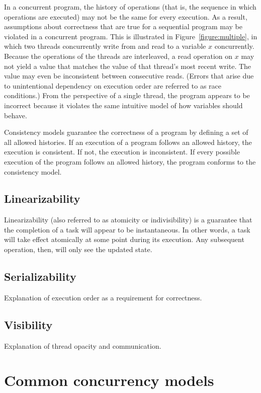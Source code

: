 \documentclass{sig-alternate}
\begin{document}
In a concurrent program, the history of operations (that is, the sequence in which operations are executed) may not be the same for every execution. As a result, assumptions about correctness that are true for a sequential program may be violated in a concurrent program. This is illustrated in Figure~\ref{figure:multiple}, in which two threads concurrently write from and read to a variable $x$ concurrently. Because the operations of the threads are interleaved, a read operation on $x$ may not yield a value that matches the value of that thread's most recent write. The value may even be inconsistent between consecutive reads. (Errors that arise due to unintentional dependency on execution order are referred to as race conditions.) From the perspective of a single thread, the program appears to be incorrect because it violates the same intuitive model of how variables should behave.

Consistency models guarantee the correctness of a program by defining a set of all allowed histories. If an execution of a program follows an allowed history, the execution is consistent. If not, the execution is inconsistent. If every possible execution of the program follows an allowed history, the program conforms to the consistency model.

\subsection{Linearizability}

Linearizability (also referred to as atomicity or indivisibility) is a guarantee that the completion of a task will appear to be instantaneous. In other words, a task will take effect atomically at some point during its execution. Any subsequent operation, then, will only see the updated state.

\subsection{Serializability}

Explanation of execution order as a requirement for correctness.

\subsection{Visibility}

Explanation of thread opacity and communication.

\section{Common concurrency models}
\end{document}
